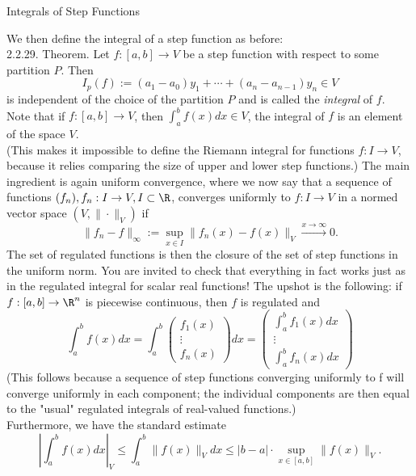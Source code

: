 \documentclass[smaller,hyperref={CJKbookmarks=true}]{beamer}
\begin{document}
\begin{frame}{Integrals of Step Functions}
\begin{spacing}{1.05}
\vspace*{16pt}
We then define the integral of a step function as before:\\[6pt]
\alert{2.2.29. Theorem.} Let $f:[a,b]\to V$ be a step function with respect to some partition $P$. Then
\[I_p(f):=(a_1-a_0)y_1+\cdots+(a_n-a_{n-1})y_n\in V\]
is independent of the choice of the partition $P$ and is called the \emph{integral} of $f$.\\[5pt]
Note that if $f:[a,b]\to V$, then $\int_{a}^{b}f(x)dx\in V$, the integral of $f$ is an element of the space $V$.\\[6pt]
(This makes it impossible to define the Riemann integral for functions $f:I\to V$, because it relies comparing the size of upper and lower step functions.)
\newpage
\vspace*{19pt}
The main ingredient is again uniform convergence, where we now say that a sequence of functions $(f_n),f_n:I\to V,I\subset\R$, converges uniformly to $f:I\to V$ in a normed vector space $(V,\|\cdot\|_V)$ if
\[\|f_n-f\|_{\infty}:=\sup_{x\in I}\|f_n(x)-f(x)\|_V\xrightarrow[]{x\to\infty}0.\]
The set of regulated functions is then the closure of the set of step
functions in the uniform norm. You are invited to check that everything in
fact works just as in the regulated integral for scalar real functions!
\newpage
The upshot is the following: if $f:[a,b]\to\R^n$ is piecewise continuous, then $f$ is regulated and
\[\int_{a}^{b}f(x)dx=\int_{a}^{b}\begin{pmatrix}
                                   f_1(x) \\
                                   \vdots \\
                                   f_n(x)
                                 \end{pmatrix}dx=\begin{pmatrix}
                                                   \int_{a}^{b}f_1(x)dx \\
                                                   \vdots \\
                                                   \int_{a}^{b}f_n(x)dx
                                                 \end{pmatrix}\]
(This follows because a sequence of step functions converging uniformly to
f will converge uniformly in each component; the individual components
are then equal to the "usual" regulated integrals of real-valued functions.)\\[5pt]
Furthermore, we have the standard estimate
\[\left|\int_{a}^{b}f(x)dx\right|_V\leq\int_{a}^{b}\|f(x)\|_Vdx\leq|b-a|\cdot\sup\limits_{x\in[a,b]}\|f(x)\|_V.\]
\end{spacing}
\end{frame}
\end{document}
